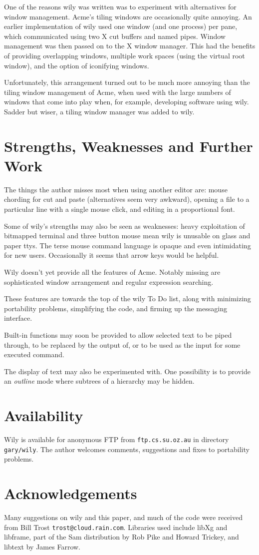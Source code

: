 \documentclass[twocolumn]{article}
\begin{document}
One of the reasons wily was written was to experiment with alternatives for window
management.  Acme's tiling windows are occasionally quite annoying.  An earlier implementation
of wily used one window (and one process) per pane, which communicated using two
X cut buffers and named pipes.  Window management was then passed on to
the X window manager.  This had the benefits of providing
overlapping windows, multiple work spaces (using the virtual root window), and the
option of iconifying windows.

Unfortunately, this arrangement turned out to be much more annoying than
the tiling window management of Acme, when used with the large numbers of
windows that come into play when, for example, developing software using wily.
Sadder but wiser, a tiling window manager was added to wily.
\section{Strengths, Weaknesses and Further Work}

The things the author misses most when using another editor are:
mouse chording for cut and paste (alternatives seem very awkward),
opening a file to a particular line with a single mouse click, and editing
in a proportional font.

Some of wily's strengths may also be seen as weaknesses:  heavy exploitation
of bitmapped terminal and three button mouse mean wily is unusable on glass
and paper ttys.  The terse mouse command language is opaque and even intimidating
for new users.  Occasionally it seems that arrow keys would be helpful.

Wily doesn't yet provide all the features of Acme.  Notably missing
are sophisticated window arrangement and regular expression searching.

These features are towards the top of the wily To Do list, along with
minimizing portability problems, simplifying the code, and firming up the messaging
interface. 

Built-in functions may soon be provided to allow selected text to
be piped through, to be replaced by the output of, or to be used as the input for
some executed command.

The display of text may also be experimented with.  One possibility is
to provide an \emph{outline} mode where subtrees of a hierarchy may be
hidden.
\section{Availability}


Wily is available for anonymous FTP from \texttt{ftp.cs.su.oz.au} in directory
\texttt{gary/wily}.  The author welcomes comments, suggestions and
fixes to portability problems.
\section{Acknowledgements}

Many suggestions on wily and this paper, and much of the code  were received
from Bill Trost \texttt{trost@cloud.rain.com}.  Libraries
used include libXg and libframe, part of the Sam distribution by Rob Pike and
Howard Trickey, and libtext by James Farrow.


\end{document}
